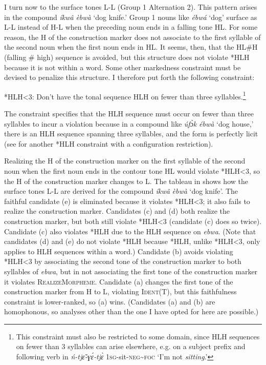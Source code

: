 \documentclass[output=paper]{langscibook}
\begin{document}
I turn now to the surface tones L-L (Group 1 Alternation 2). This pattern arises in the compound \textit{íkwâ} \textit{èbwà} ‘dog knife.’ Group 1 nouns like \textit{ébwá} ‘dog’ surface as L-L instead of H-L when the preceding noun ends in a falling tone HL. For some reason, the H of the construction marker does not associate to the first syllable of the second noun when the first noun ends in HL. It seems, then, that the HL\#H (falling \# high) sequence is avoided, but this structure does not violate *HLH because it is not within a word. Some other markedness constraint must be devised to penalize this structure. I therefore put forth the following constraint: 

\ea \label{ex:glewwe:5}
{*HLH<3: Don’t have the tonal sequence HLH on fewer than three syllables.\footnote{This constraint must also be restricted to some domain, since HLH sequences on fewer than 3 syllables can arise elsewhere, e.g. on a subject prefix and following verb in \textit{ń-tjɛ̌‑ɣɛ́‑tjɛ̀} \textsc{1sg-}sit\textsc{-neg{\textasciitilde}foc} ‘I’m not \textit{sitting}.’} }\\
\z

The constraint specifies that the HLH sequence must occur on fewer than three syllables to incur a violation because in a compound like \textit{úfɔ̀k} \textit{ébwà} ‘dog house,’ there is an HLH sequence spanning three syllables, and the form is perfectly licit (see \citealt{McPherson2016c} for another *HLH constraint with a configuration restriction). 

Realizing the H of the construction marker on the first syllable of the second noun when the first noun ends in the contour tone HL would violate *HLH<3, so the H of the construction marker changes to L. The tableau in  shows how the surface tones L-L are derived for the compound \textit{íkwâ} \textit{èbwà} ‘dog knife’.
The faithful candidate (e) is eliminated because it violates *HLH<3; it also fails to realize the construction marker. Candidates (c) and (d) both realize the construction marker, but both still violate *HLH<3 (candidate (c) does so twice). Candidate (c) also violates *HLH due to the HLH sequence on \textit{ebwa}. (Note that candidates (d) and (e) do not violate *HLH because *HLH, unlike *HLH<3, only applies to HLH sequences within a word.) Candidate (b) avoids violating *HLH<3 by associating the second tone of the construction marker to both syllables of \textit{ebwa}, but in not associating the first tone of the construction marker it violates \textsc{RealizeMorpheme}. Candidate (a) changes the first tone of the construction marker from H to L, violating \textsc{Ident(T)}, but this faithfulness constraint is lower-ranked, so (a) wins. (Candidates (a) and (b) are homophonous, so analyses other than the one I have opted for here are possible.)\largerpage   
  
\end{document}
